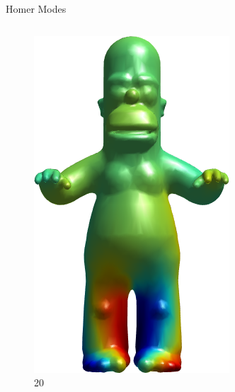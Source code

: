 \documentclass{beamer}
\begin{document}
\begin{frame}{Homer Modes}
\begin{columns}
\begin{column}[T]{3cm}
\begin{figure}[t]
    \includegraphics[width=\textwidth]{Harmonics/HomerModes/20.png}
    \caption*{\huge 20}
\end{figure}
\end{column}
\end{columns}

\end{frame}
\end{document}
